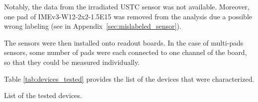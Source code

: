 Notably, the data from the irradiated USTC sensor was not available. Moreover, one pad of IMEv3-W12-2x2-1.5E15 was removed from the analysis due a possible wrong labeling (see in Appendix~\ref{sec:mislabeled_sensor}).

The sensors were then installed onto readout boards. In the case of multi-pads sensors, some number of pads were each connected to one channel of the board, so that they could be measured individually.

Table \ref{tab:devices_tested} provides the list of the devices that were characterized.


\begin{table}[h!tbp]  
    \centering
    \captionsetup{width=\captionwidth}
    \caption{List of the tested devices.}
    \label{tab:devices_tested}


\end{table}
